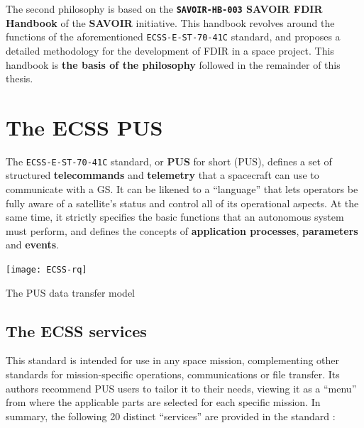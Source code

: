 \documentclass[a4paper,nobib,final]{tufte-book}
\begin{document}
The second philosophy is based on the \textbf{\texttt{SAVOIR-HB-003} \acs{SAVOIR} \acs{FDIR} Handbook} \autocite{SAVOIR-HB-003} of the \textbf{\acf{SAVOIR}} initiative. This handbook revolves around the functions of the aforementioned \texttt{ECSS-E-ST-70-41C} standard, and proposes a detailed methodology for the development of \ac{FDIR} in a space project. This handbook is \textbf{the basis of the philosophy} followed in the remainder of this thesis.

\section{The \acs{ECSS} \acl{PUS}}
\label{sec:pus}


The \texttt{ECSS-E-ST-70-41C} standard, or \textbf{\acs{PUS}} for short (\acl{PUS}), defines a set of structured \textbf{telecommands} and \textbf{telemetry} that a spacecraft can use to communicate with a \acl{GS}. It can be likened to a ``language'' that lets operators be fully aware of a satellite's status and control all of its operational aspects. At the same time, it strictly specifies the basic functions that an autonomous system must perform, and defines the concepts of \textbf{application processes}, \textbf{parameters} and \textbf{events}.

\begin{marginfigure}
	\texttt{[image: ECSS-rq]}
	\caption{The \ac{PUS} data transfer model}
	\label{fig:pusmodel}
\end{marginfigure}

\subsection{The \acs{ECSS} services}

This standard is intended for use in any space mission, complementing other standards for mission-specific operations, communications or file transfer. Its authors recommend \acs{PUS} users to tailor it to their needs, viewing it as a ``menu'' from where the applicable parts are selected for each specific mission. In summary, the following 20 distinct ``services'' are provided in the standard \autocite{ECSS-E-ST-70-41C,ECSS-E-70-41A,kaufeler_esa_standard_1994}:
\end{document}
